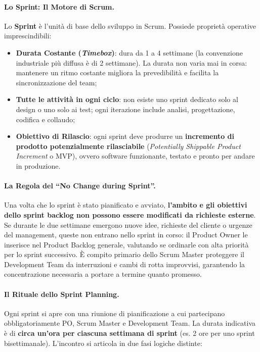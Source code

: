 \documentclass[12pt]{extarticle}
\begin{document}
\paragraph{Lo Sprint: Il Motore di Scrum.}
Lo \textbf{Sprint} è l'unità di base dello sviluppo in Scrum. Possiede proprietà operative imprescindibili:
\begin{itemize}
    \item \textbf{Durata Costante (\textit{Timebox})}: dura da 1 a 4 settimane (la convenzione industriale più diffusa è di 2 settimane). La durata non varia mai in corsa: mantenere un ritmo costante migliora la prevedibilità e facilita la sincronizzazione del team;
    \item \textbf{Tutte le attività in ogni ciclo}: non esiste uno sprint dedicato solo al design o uno solo ai test; ogni iterazione include analisi, progettazione, codifica e collaudo;
    \item \textbf{Obiettivo di Rilascio}: ogni sprint deve produrre un \textbf{incremento di prodotto potenzialmente rilasciabile} (\textit{Potentially Shippable Product Increment} o MVP), ovvero software funzionante, testato e pronto per andare in produzione.
\end{itemize}

\paragraph{La Regola del ``No Change during Sprint''.}
Una volta che lo sprint è stato pianificato e avviato, \textbf{l'ambito e gli obiettivi dello sprint backlog non possono essere modificati da richieste esterne}. 
Se durante le due settimane emergono nuove idee, richieste del cliente o urgenze del management, queste non entrano nello sprint in corso: il Product Owner le inserisce nel Product Backlog generale, valutando se ordinarle con alta priorità per lo sprint successivo. È compito primario dello Scrum Master proteggere il Development Team da interruzioni e cambi di rotta improvvisi, garantendo la concentrazione necessaria a portare a termine quanto promesso.

\paragraph{Il Rituale dello Sprint Planning.}
Ogni sprint si apre con una riunione di pianificazione a cui partecipano obbligatoriamente PO, Scrum Master e Development Team. La durata indicativa è di \textbf{circa un'ora per ciascuna settimana di sprint} (es. 2 ore per uno sprint bisettimanale). L'incontro si articola in due fasi logiche distinte:
\end{document}
